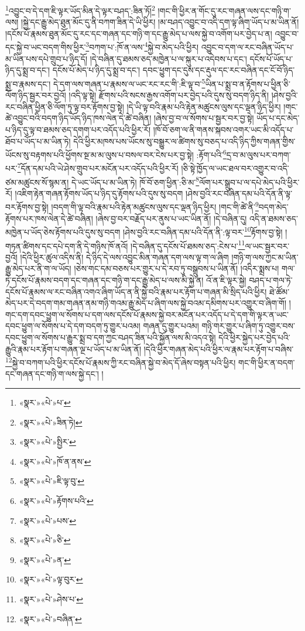 \footnote{«སྣར་»«པེ་»པ་}འབྱུང་བ་དེ་དག་ཇི་ལྟར་ཡོད་མིན་དེ་ལྟར་བཤད་:ཟིན་ཏོ།\footnote{«སྣར་»«པེ་»ཟིན་ཏེ།} །གང་གི་ཕྱིར་ན་གོང་དུ་རང་གཞན་ལས་དང་གཉི་ག་ལས། །སྐྱེ་དང་རྒྱུ་མེད་ཐུན་མོང་དུ་ནི་བཀག་ཟིན་དེ་ཡི་ཕྱིར། །མ་བཤད་འབྱུང་བ་འདི་དག་ལྟ་ཞིག་ཡོད་པ་མ་ཡིན་ནོ། །དངོས་པོ་རྣམས་ཐུན་མོང་དུ་རང་དང་གཞན་དང་གཉི་ག་དང་རྒྱུ་མེད་པ་ལས་སྐྱེ་བ་འགོག་པར་བྱེད་པ་ན། འབྱུང་བ་དང་སྐྱེ་བ་ཡང་བདག་གིས་ཕྱིར་\footnote{«སྣར་»«པེ་»སྤྱིར་}བཀག་པ་:ཁོ་ན་ལས་\footnote{«སྣར་»«པེ་»ཁོ་ན་ནས་}སྐྱེ་བ་མེད་པའི་ཕྱིར། འབྱུང་བ་དག་ལ་རང་བཞིན་ཡོད་པ་མ་ཡིན་པས་དཔེ་གྲུབ་པ་ཉིད་དོ། །དེ་བཞིན་དུ་ཐམས་ཅད་མཁྱེན་པ་ལ་སྐུར་པ་འདེབས་པ་དང་། དངོས་པོ་ཡོད་པ་ཉིད་དུ་སྨྲ་བ་དང་། དངོས་པོ་མེད་པ་ཉིད་དུ་སྨྲ་བ་དང་། དབང་ཕྱུག་དང་དུས་དང་རྡུལ་དང་རང་བཞིན་དང་ངོ་བོ་ཉིད་སྨྲ་བ་རྣམས་དང་། དེ་དག་ལས་གཞན་པ་རྣམས་ལ་ཡང་རང་རང་གི་:ཇི་ལྟ་བ་\footnote{«སྣར་»«པེ་»ཇི་ལྟ་བུ་}ཡིན་པ་སྨྲ་བ་ན་རྟོགས་པ་ཕྱིན་ཅི་ལོག་ཉིད་སྦྱར་བར་བྱའོ། །འདི་ལྟ་སྟེ། རྫོགས་པའི་སངས་རྒྱས་འགོག་པར་བྱེད་པའི་དུས་སུ་བདག་ཉིད་ནི། །ཤེས་བྱའི་རང་བཞིན་ཕྱིན་ཅི་ལོག་ཏུ་ལྟ་བར་རྟོགས་བྱ་སྟེ། །དེ་ཡི་ལྟ་བའི་རྣམ་པའི་རྟེན་མཚུངས་ལུས་དང་ལྡན་ཉིད་ཕྱིར། །གང་ཚེ་འབྱུང་བའི་བདག་ཉིད་ཡོད་ཉིད་ཁས་ལེན་དེ་ཚེ་བཞིན། །ཞེས་བྱ་བ་ལ་སོགས་པ་སྦྱར་བར་བྱ་སྟེ། ཡོད་པ་དང་མེད་པ་ཉིད་དུ་ལྟ་བ་ཐམས་ཅད་དགག་པར་འདོད་པའི་ཕྱིར་རོ། །ཁོ་བོ་ཅག་ལ་ནི་གནས་སྐབས་འགར་ཡང་མི་འདོད་པ་ཐོབ་པ་ཡོད་པ་མ་ཡིན་ཏེ། དེའི་ཕྱིར་མཁས་པས་ཡོངས་སུ་བསྒྱུར་ལ་ཚིགས་སུ་བཅད་པ་འདི་ཉིད་ཀྱིས་གཞན་གྱིས་ཡོངས་སུ་བརྟགས་པའི་ཕྱོགས་སྔ་མ་མ་ལུས་པ་བསལ་བར་ངེས་པར་བྱ་སྟེ། :རྟོག་པའི་\footnote{«སྣར་»«པེ་»རྟོགས་པའི་}དྲ་བ་མ་ལུས་པར་བཀག་པར་\footnote{«སྣར་»«པེ་»པས་}དོན་དམ་པའི་ཡེ་ཤེས་གྲུབ་པར་མངོན་པར་འདོད་པའི་ཕྱིར་རོ། །ཅི་སྟེ་ཁྱོད་ལ་ཡང་ཐལ་བར་འགྱུར་བ་འདི་ཙམ་མཚུངས་སོ་སྙམ་ན། དེ་ཡང་ཡོད་པ་མ་ཡིན་ཏེ། ཁོ་བོ་ཅག་ཕྱིན་:ཅི་མ་\footnote{«སྣར་»«པེ་»ཅི་}ལོག་པར་སྒྲུབ་པ་ལ་དཔེ་མེད་པའི་ཕྱིར་རོ། །འཇིག་རྟེན་གཞན་རྟོགས་ཡོད་པ་ཉིད་དུ་རྟོགས་པའི་དུས་སུ་བདག །ཤེས་བྱའི་རང་བཞིན་དམ་པའི་དོན་ནི་ལྟ་བར་རྟོགས་བྱ་སྟེ། །བདག་གི་ལྟ་བའི་རྣམ་པའི་རྟེན་མཚུངས་ལུས་དང་ལྡན་ཉིད་ཕྱིར། །གང་གི་ཚེ་ནི་\footnote{«སྣར་»«པེ་»ན་}བདག་མེད་རྟོགས་པར་ཁས་ལེན་དེ་ཚེ་བཞིན། །ཞེས་བྱ་བར་བརྗོད་པར་ནུས་པ་ཡང་ཡིན་ནོ། །དེ་བཞིན་དུ། འདི་ན་ཐམས་ཅད་མཁྱེན་པ་ཡོད་ཅེས་རྟོགས་པའི་དུས་སུ་བདག །ཤེས་བྱའི་རང་བཞིན་དམ་པའི་དོན་ནི་:ལྟ་བར་\footnote{«སྣར་»«པེ་»ལྟ་བུར་}རྟོགས་བྱ་སྟེ། །གཏན་ཚིགས་དང་དཔེ་དག་ནི་དེ་གཉིས་ཁོ་ནའོ། །དེ་བཞིན་དུ་དངོས་པོ་ཐམས་ཅད་:ངེས་པ་\footnote{«སྣར་»«པེ་»ཤེས་པ་}ལ་ཡང་སྦྱར་བར་བྱའོ། །དེའི་ཕྱིར་ཚུལ་འདིས་ནི། དེ་ཉིད་དེ་ལས་འབྱུང་མིན་གཞན་དག་ལས་ལྟ་ག་ལ་ཞིག །གཉི་ག་ལས་ཀྱང་མ་ཡིན་རྒྱུ་མེད་པར་ནི་ག་ལ་ཡོད། །ཅེས་གང་དམ་བཅས་པར་གྱུར་པ་དེ་རབ་ཏུ་བསྒྲུབས་པ་ཡིན་ནོ། །འདིར་སྨྲས་པ། གལ་ཏེ་དངོས་པོ་རྣམས་བདག་དང་གཞན་དང་གཉི་ག་དང་རྒྱུ་མེད་པ་ལས་མི་སྐྱེ་ན། འོ་ན་ཇི་ལྟར་སྐྱེ། བཤད་པ་གལ་ཏེ་དངོས་པོ་རྣམས་ལ་རང་བཞིན་འགའ་ཞིག་ཡོད་ན་ནི་སྐྱེ་བའི་རྣམ་པར་རྟོག་པ་གཞན་མི་སྲིད་པའི་ཕྱིར། ཐེ་ཚོམ་མེད་པར་དེ་བདག་གམ་གཞན་ནམ་གཉི་གའམ་རྒྱུ་མེད་པ་ཞིག་ལས་སྐྱེ་བའམ་དམིགས་པར་འགྱུར་བ་ཞིག་གོ། །གང་དག་དབང་ཕྱུག་ལ་སོགས་པ་དག་ལས་དངོས་པོ་རྣམས་སྐྱེ་བར་མངོན་པར་འདོད་པ་དེ་དག་གི་ལྟར་ན་ཡང་དབང་ཕྱུག་ལ་སོགས་པ་དེ་དག་བདག་ཏུ་གྱུར་པའམ། གཞན་དུ་གྱུར་པའམ། གཉི་གར་གྱུར་པ་ཞིག་ཏུ་འགྱུར་བས་དབང་ཕྱུག་ལ་སོགས་པ་རྒྱུར་སྨྲ་བ་དག་ཀྱང་བཤད་ཟིན་པའི་སྐྱོན་ལས་མི་འདའ་སྟེ། དེའི་ཕྱིར་སྐྱེད་པར་བྱེད་པའི་རྒྱུའི་རྣམ་པར་རྟོག་པ་གཞན་ལྔ་པ་ཡོད་པ་མ་ཡིན་ནོ། །དེའི་ཕྱིར་གཞན་མེད་པའི་ཕྱིར་ལ་རྣམ་པར་རྟོག་པ་བཞིས་\footnote{«སྣར་»«པེ་»བཞིན་}སྐྱེ་བ་བཀག་པའི་ཕྱིར་དངོས་པོ་རྣམས་ཀྱི་རང་བཞིན་སྐྱེ་བ་མེད་དོ་ཞེས་བསྟན་པའི་ཕྱིར། གང་གི་ཕྱིར་ན་བདག་དང་གཞན་དང་གཉི་ག་ལས་སྐྱེ་དང་། །
